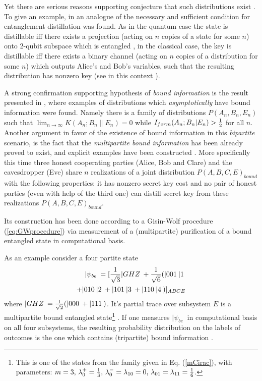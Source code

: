 \documentclass[rmp,12pt,preprint]{revtex4-2}
\begin{document}
Yet there are serious reasons supporting conjecture that such
distributions exist
\cite{GiReWo02,RenWol02b}. To give an example, in \cite{RenWol02b}
an analogue of the necessary and sufficient condition for
entanglement distillation was found. As in the quantum case the
state is distillable iff there exists a projection (acting on $n$
copies of a state for some $n$) onto 2-qubit subspace which is
entangled \cite{bound}, in the classical case, the key is
distillable iff there exists a binary channel (acting on $n$ copies
of a distribution for some $n$) which outputs Alice's and Bob's
variables, such that the resulting distribution has nonzero key (see
in this context \cite{ALG_2_equiv,AcGisScar03,QKA_CKA_equivalance}).

A strong confirmation supporting hypothesis of {\it bound
information} is the result presented in \cite{renner-wolf-gap},
where examples of distributions which {\it asymptotically} have
bound information were found. Namely there is a family of
distributions $P(A_n,B_n,E_n)$ such that $\lim_{n\rightarrow \infty}
K(A_n;B_n\|E_n)=0$ while $I_{form}(A_n;B_n|E_n)>{1\over 2}$ for all $n$.
Another argument in favor of the existence of bound information in
this {\it bipartite} scenario, is the fact that the {\it
multipartite bound information} has been already proved to exist,
and explicit examples have been constructed \cite{AcinCM-MultiBoundInfo}.
More specifically this time three honest cooperating parties
(Alice, Bob and Clare) and the eavesdropper (Eve) share $n$
realizations of a joint distribution $P(A,B,C,E)_{bound}$ with the
following properties: it has nonzero secret key cost and no pair of
honest parties (even with help of the third one) can distill secret
key from these realizations $P(A,B,C,E)_{bound}$.

Its construction has been done according to a Gisin-Wolf procedure (\ref{eq:GWprocedure}) via measurement of a (multipartite) purification of a bound entangled state in computational basis.

As an example consider a four partite state
\begin{eqnarray}
|\psi_{be}\>=[{1\over{\sqrt{3}}}|GHZ\> +
{1\over{\sqrt{6}}}(|001\>|1\>
\nonumber\\
+|010\>|2\>+|101\>|3\>+|110\>|4\>)]_{ABCE}
\end{eqnarray}
where $|GHZ\>
={1\over{\sqrt{2}}}(|000\>+|111\>)$. It's partial trace over subsystem
$E$ is a multipartite bound entangled state\footnote{
This is one of the states from the family
given in Eq. (\ref{mCirac}), with parameters: $m=3,\, \lambda_0^+={1\over 3},\, \lambda_0^-=\lambda_{10}=0,\, \lambda_{01}=\lambda_{11}={1\over 6}$.} \cite{DCpur,DurC_multi_dist2000}.
If one measures $|\psi_{be}\>$ in computational basis on all four
subsystems, the resulting probability distribution on the labels of
outcomes is the one which contains (tripartite) bound information
\cite{AcinCM-MultiBoundInfo}.
\end{document}
